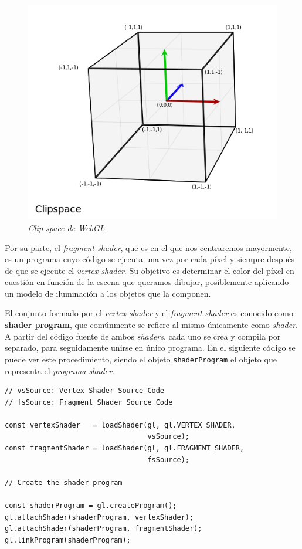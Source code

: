 \begin{figure} [ht]
    \centering
    \includegraphics[scale = 0.5]{img/C5/clip-space-graph.png}
    \caption{\textit{Clip space de WebGL}}
    \label{fig:clipspace}
\end{figure}

Por su parte, el \textit{fragment shader}, que es en el que nos centraremos mayormente, es un programa cuyo código se ejecuta una vez por cada píxel y siempre después de que se ejecute el \textit{vertex shader}. Su objetivo es determinar el color del píxel en cuestión en función de la escena que queramos dibujar, posiblemente aplicando un modelo de iluminación a los objetos que la componen.

El conjunto formado por el \textit{vertex shader} y el \textit{fragment shader} es conocido como \textbf{shader program}, que comúnmente se refiere al mismo únicamente como \textit{shader}. A partir del código fuente de ambos \textit{shaders}, cada uno se crea y compila por separado, para seguidamente unirse en único programa. En el siguiente código se puede ver este procedimiento, siendo el objeto \verb|shaderProgram| el objeto que representa el \textit{programa shader}.

\begin{lstlisting}
// vsSource: Vertex Shader Source Code
// fsSource: Fragment Shader Source Code

const vertexShader   = loadShader(gl, gl.VERTEX_SHADER, 
                                  vsSource);
const fragmentShader = loadShader(gl, gl.FRAGMENT_SHADER, 
                                  fsSource);
  
// Create the shader program

const shaderProgram = gl.createProgram();
gl.attachShader(shaderProgram, vertexShader);
gl.attachShader(shaderProgram, fragmentShader);
gl.linkProgram(shaderProgram);
\end{lstlisting}

